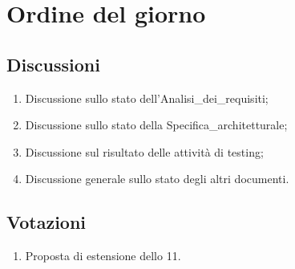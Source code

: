 \section{Ordine del giorno} \label{sec:agenda}
\subsection{Discussioni} \label{subsec:discussione}
\begin{enumerate}
    \item Discussione sullo stato dell'Analisi\_dei\_requisiti;
    \item Discussione sullo stato della Specifica\_architetturale;
    \item Discussione sul risultato delle attività di testing;
    \item Discussione generale sullo stato degli altri documenti.
\end{enumerate}

\subsection{Votazioni} \label{subsec:votazione}
\begin{enumerate}
    \item Proposta di estensione dello  11.
\end{enumerate}